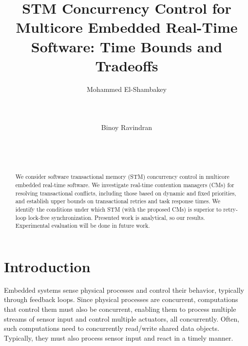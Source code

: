 \documentclass{sig-alternate}
\begin{document}
\title{STM Concurrency Control for Multicore Embedded Real-Time Software: Time Bounds and Tradeoffs%
}


\author{
\alignauthor Mohammed El-Shambakey\\
\\
\\
\\
\alignauthor Binoy Ravindran\\
\\
\\
\\
}

\maketitle

\begin{abstract}
We consider software transactional memory (STM) concurrency control in multicore embedded real-time software. We investigate real-time contention managers (CMs) for resolving transactional conflicts, including those based on dynamic and fixed priorities, and establish upper bounds on transactional retries and task response times. We identify the conditions under which STM (with the proposed CMs) is superior to retry-loop lock-free synchronization. Presented work is analytical, so our results. Experimental evaluation will be done in future work.

\end{abstract}

\section{Introduction}
\label{sec:intro}

Embedded systems sense physical processes and control their behavior, typically through feedback loops. Since physical processes are concurrent, computations that control them must also be concurrent, enabling them to process multiple streams of sensor input and control multiple actuators, all concurrently. Often, such computations need to concurrently read/write shared data objects. Typically, they must also process sensor input and react in a timely manner. 
\end{document}
